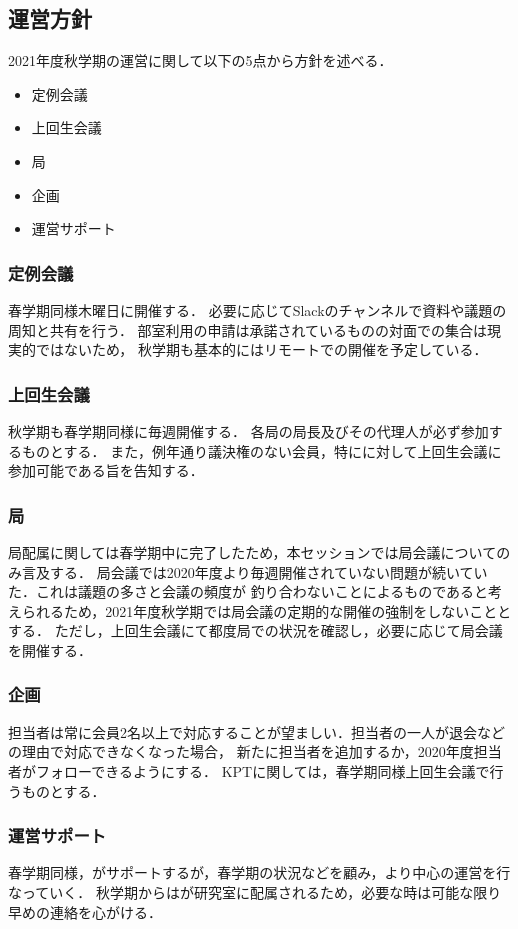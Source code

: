 \subsection*{運営方針}


2021年度秋学期の運営に関して以下の5点から方針を述べる．
\begin{itemize}
    \item 定例会議
    \item 上回生会議
    \item 局
    \item 企画
    \item 運営サポート
\end{itemize}

\subsubsection*{定例会議}
春学期同様木曜日に開催する．
必要に応じてSlackのチャンネルで資料や議題の周知と共有を行う．
部室利用の申請は承諾されているものの対面での集合は現実的ではないため，
秋学期も基本的にはリモートでの開催を予定している．

\subsubsection*{上回生会議}
秋学期も春学期同様に毎週開催する．
各局の局長及びその代理人が必ず参加するものとする．
また，例年通り議決権のない会員，特に\firstGrade{}に対して上回生会議に
参加可能である旨を告知する．

\subsubsection*{局}
局配属に関しては春学期中に完了したため，本セッションでは局会議についてのみ言及する．
局会議では2020年度より毎週開催されていない問題が続いていた．これは議題の多さと会議の頻度が
釣り合わないことによるものであると考えられるため，2021年度秋学期では局会議の定期的な開催の強制をしないこととする．
ただし，上回生会議にて都度局での状況を確認し，必要に応じて局会議を開催する．

\subsubsection*{企画}
担当者は常に会員2名以上で対応することが望ましい．担当者の一人が退会などの理由で対応できなくなった場合，
新たに担当者を追加するか，2020年度担当者がフォローできるようにする．
KPTに関しては，春学期同様上回生会議で行うものとする．

\subsubsection*{運営サポート}
春学期同様，\thirdGrade{}がサポートするが，春学期の状況などを顧み，より\secondGrade{}中心の運営を行なっていく．
秋学期からは\thirdGrade{}が研究室に配属されるため，必要な時は可能な限り早めの連絡を心がける．
